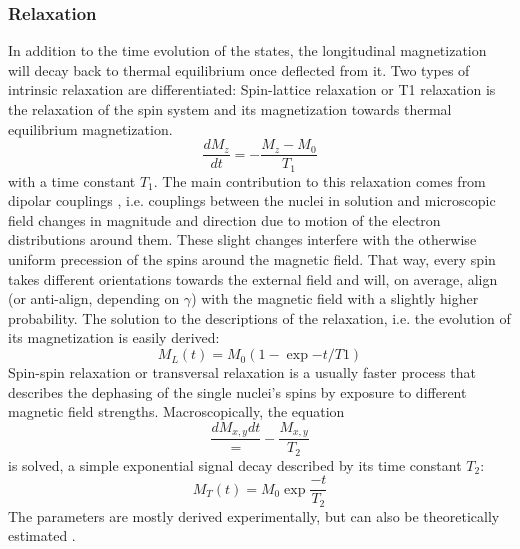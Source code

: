         \subsubsection{Relaxation}
        In addition to the time evolution of the states, the longitudinal magnetization will decay back to thermal equilibrium once deflected from it. Two types of intrinsic relaxation are differentiated:
        Spin-lattice relaxation or T1 relaxation is the relaxation of the spin system and its magnetization towards thermal equilibrium magnetization. 
        \begin{equation}
            \frac{dM_z}{dt}= -\frac{M_z-M_0}{T_1}
        \end{equation}
        with a time constant $T_1$. The main contribution to this relaxation comes from dipolar couplings \cite{levitt_spin_nodate}, i.e. couplings between the nuclei in solution and microscopic field changes in magnitude and direction due to motion of the electron distributions around them. These slight changes interfere with the otherwise uniform precession of the spins around the magnetic field. That way, every spin takes different orientations towards the external field and will, on average, align (or anti-align, depending on $\gamma$) with the magnetic field with a slightly higher probability. The solution to the descriptions of the relaxation, i.e. the  evolution of its magnetization is easily derived:
        \begin{equation}
            M_L(t) = M_0(1 - \exp{-t/T1})
        \end{equation}
        Spin-spin relaxation or transversal relaxation is a usually faster process that describes the dephasing of the single nuclei's spins by exposure to different magnetic field strengths. Macroscopically, the equation
        \begin{equation}
        \frac{dM_{x,y}{dt}} = - \frac{M_{x,y}}{T_2}
        \end{equation}
        is solved, a simple exponential signal decay described by its time constant $T_2$:
        \begin{equation}
            M_T(t) = M_0\exp{\frac{-t}{T_2}}
        \end{equation}
        The parameters are mostly derived experimentally, but can also be theoretically estimated \cite{kaupp_calculation_2003}.
